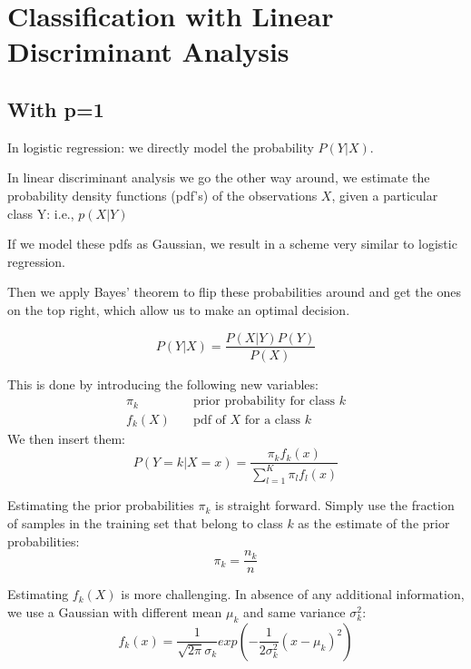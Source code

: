 \documentclass[../Main.tex]{subfiles}
\begin{document}
\newpage
\section{Classification with Linear Discriminant Analysis}
\subsection{With p=1}
In logistic regression: we directly 
model the probability \(P(Y | X)\).

In linear discriminant analysis we go 
the other way around, we estimate 
the probability density functions 
(pdf's) of the observations \(X\), given a 
particular class Y: i.e., \(p(X|Y)\)


If we model these pdfs as Gaussian, we 
result in a scheme very similar to logistic 
regression.


Then we apply Bayes' theorem to flip 
these probabilities around and get 
the ones on the top right, which 
allow us to make an optimal decision.

\begin{equation}
    P(Y|X) = \frac{P(X|Y)P(Y)}{P(X)}
\end{equation}

This is done by introducing the following new variables:
\begin{equation*}
    \begin{split}
        \pi_k &\quad \text{prior probability for class }k\\
        f_k(X) &\quad \text{pdf of } X \text{ for a class } k
    \end{split}
\end{equation*}
We then insert them:
\begin{equation*}
    P(Y=k|X=x) = \frac{\pi_k f_k(x)}{\sum_{l=1}^{K} \pi_l f_l(x)}
\end{equation*}

Estimating the prior probabilities \(\pi_k\) is 
straight forward. Simply use the fraction of samples in the 
training set that belong to class \(k\) as the 
estimate of the prior probabilities:
\begin{equation*}
    \pi_k = \frac{n_k}{n}
\end{equation*}

Estimating \(f_k(X)\) is more challenging.
In absence of any additional information, we use a Gaussian with different mean \(\mu_k\) and same variance \(\sigma_k^2\):
\begin{equation*}
    f_k(x) = \frac{1}{\sqrt{2\pi}\sigma_k} exp(-\frac{1}{2\sigma_k^2} (x - \mu_k)^2)
\end{equation*}
\end{document}
